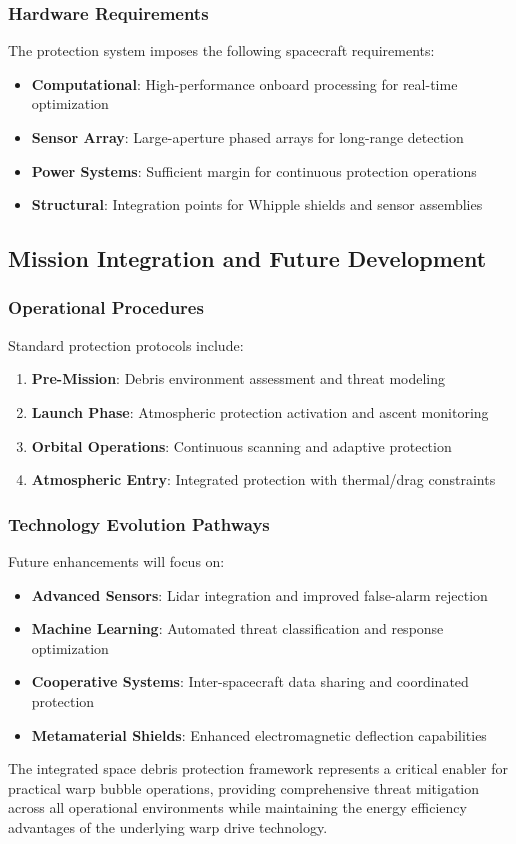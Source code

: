 \subsubsection{Hardware Requirements}
The protection system imposes the following spacecraft requirements:
\begin{itemize}
\item \textbf{Computational}: High-performance onboard processing for real-time optimization
\item \textbf{Sensor Array}: Large-aperture phased arrays for long-range detection
\item \textbf{Power Systems}: Sufficient margin for continuous protection operations
\item \textbf{Structural}: Integration points for Whipple shields and sensor assemblies
\end{itemize}

\subsection{Mission Integration and Future Development}

\subsubsection{Operational Procedures}
Standard protection protocols include:
\begin{enumerate}
\item \textbf{Pre-Mission}: Debris environment assessment and threat modeling
\item \textbf{Launch Phase}: Atmospheric protection activation and ascent monitoring
\item \textbf{Orbital Operations}: Continuous scanning and adaptive protection
\item \textbf{Atmospheric Entry}: Integrated protection with thermal/drag constraints
\end{enumerate}

\subsubsection{Technology Evolution Pathways}
Future enhancements will focus on:
\begin{itemize}
\item \textbf{Advanced Sensors}: Lidar integration and improved false-alarm rejection
\item \textbf{Machine Learning}: Automated threat classification and response optimization
\item \textbf{Cooperative Systems}: Inter-spacecraft data sharing and coordinated protection
\item \textbf{Metamaterial Shields}: Enhanced electromagnetic deflection capabilities
\end{itemize}

The integrated space debris protection framework represents a critical enabler for practical warp bubble operations, providing comprehensive threat mitigation across all operational environments while maintaining the energy efficiency advantages of the underlying warp drive technology.
